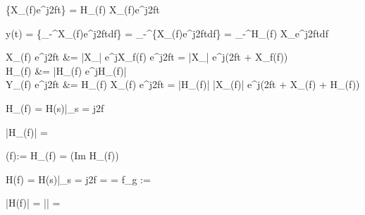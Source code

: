 \begin{abox}
	\{X_(f)e^{j2\pi ft}\} = H_(f) \cdot X_(f)e^{j2\pi ft}
\end{abox}

\begin{abox}
	y(t) = \{\int_{-\infty}^{\infty}X_(f)e^{j2\pi ft}df\} = \int_{-\infty}^{\infty}\{X_(f)e^{j2\pi ft}df\} = \int_{-\infty}^{\infty}H_(f) \cdot X_e^{j2\pi ft}df
\end{abox}

\begin{abox}
	X_(f) \cdot e^{j2\pi ft} &= \left|X_\right| \cdot e^{j\sphericalangle X_f(f)} \cdot e^{j2\pi ft} = \left|X_\right| \cdot e^{j(2\pi ft + \sphericalangle X_f(f))}\\
	H_(f) &= \left|H_(f) \cdot e^{j\sphericalangle H_(f)}\right|\\
	Y_(f) \cdot e^{j2\pi ft} &= H_(f) \cdot X_(f) \cdot e^{j2\pi ft} = \left|H_(f)\right| \cdot \left|X_(f)\right| \cdot e^{j(2\pi ft + \sphericalangle X_(f) + \sphericalangle H_(f))}
\end{abox}

\begin{abox}
	H_(f) = H(s)|_{s = j2\pi f}
\end{abox}

\begin{abox}
	\left|H_(f)\right| = 
\end{abox}

\begin{abox}
	\phi(f):= \sphericalangle H_(f) = (Im H_(f)) \cdot \arccos{}
\end{abox}

\begin{abox}
	H(f) = H(s)|_{s = j2\pi f} =  =   f_g := 
\end{abox}

\begin{abox}
	\left|H(f)\right| = \left|\right| = 
\end{abox}

